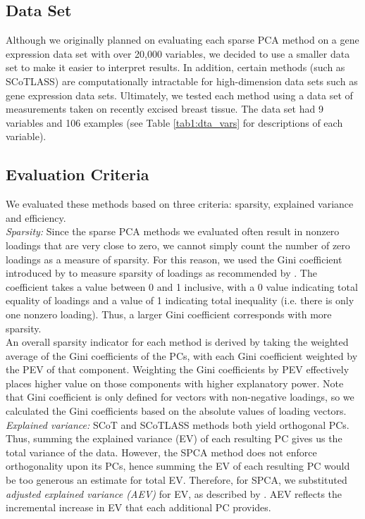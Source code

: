 \documentclass[11pt,letterpaper]{report}
\begin{document}
\subsection*{Data Set}

Although we originally planned on evaluating each sparse PCA method on a gene expression data set with over 20,000 variables, we decided to use a smaller data set to make it easier to interpret results. In addition, certain methods (such as SCoTLASS) are computationally intractable for high-dimension data sets such as gene expression data sets. Ultimately, we tested each method using a data set of measurements taken on recently excised breast tissue. The data set had 9 variables and 106 examples (see Table \ref{tab1:dta_vars} for descriptions of each variable).

\subsection*{Evaluation Criteria}

We evaluated these methods based on three criteria: sparsity, explained variance and efficiency.\\

\textit{Sparsity:} Since the sparse PCA methods we evaluated often result in nonzero loadings that are very close to zero, we cannot simply count the number of zero loadings as a measure of sparsity. For this reason, we used the Gini coefficient introduced by  to measure sparsity of loadings as recommended by . The coefficient takes a value between 0 and 1 inclusive, with a 0 value indicating total equality of loadings and a value of 1 indicating total inequality (i.e. there is only one nonzero loading). Thus, a larger Gini coefficient corresponds with more sparsity.\\

An overall sparsity indicator for each method is derived by taking the weighted average of the Gini coefficients of the PCs, with each Gini coefficient weighted by the PEV of that component. Weighting the Gini coefficients by PEV effectively places higher value on those components with higher explanatory power. Note that Gini coefficient is only defined for vectors with non-negative loadings, so we calculated the Gini coefficients based on the absolute values of loading vectors.\\

\textit{Explained variance:} SCoT and SCoTLASS methods both yield orthogonal PCs. Thus, summing the explained variance (EV) of each resulting PC gives us the total variance of the data. However, the SPCA method does not enforce orthogonality upon its PCs, hence summing the EV of each resulting PC would be too generous an estimate for total EV. Therefore, for SPCA, we substituted \textit{adjusted explained variance (AEV)} for EV, as described by . AEV reflects the incremental increase in EV that each additional PC provides.\\
\end{document}
